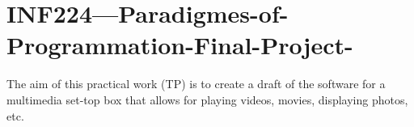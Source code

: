 \chapter{INF224---Paradigmes-\/of-\/\+Programmation-\/\+Final-\/\+Project-\/}
\hypertarget{md_cpp_2_r_e_a_d_m_e}{}\label{md_cpp_2_r_e_a_d_m_e}
\label{md_cpp_2_r_e_a_d_m_e_autotoc_md0}%
%
The aim of this practical work (TP) is to create a draft of the software for a multimedia set-\/top box that allows for playing videos, movies, displaying photos, etc. 